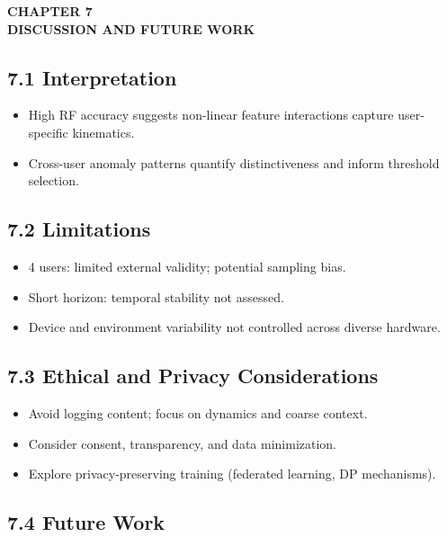 \documentclass[
  11pt,
  a4paper,
]{article}
\providecommand{\tightlist}{%
  \setlength{\itemsep}{0pt}\setlength{\parskip}{0pt}}
\begin{document}
\begin{center}
\vspace*{2cm}
\textbf{\Large CHAPTER 7}\\[0.5cm]
\textbf{\Large DISCUSSION AND FUTURE WORK}
\end{center}

\newpage

\subsection{7.1 Interpretation}\label{interpretation}

\begin{itemize}
\tightlist
\item
  High RF accuracy suggests non-linear feature interactions capture
  user-specific kinematics.
\item
  Cross-user anomaly patterns quantify distinctiveness and inform
  threshold selection.
\end{itemize}

\subsection{7.2 Limitations}\label{limitations}

\begin{itemize}
\tightlist
\item
  4 users: limited external validity; potential sampling bias.
\item
  Short horizon: temporal stability not assessed.
\item
  Device and environment variability not controlled across diverse
  hardware.
\end{itemize}

\subsection{7.3 Ethical and Privacy
Considerations}\label{ethical-and-privacy-considerations}

\begin{itemize}
\tightlist
\item
  Avoid logging content; focus on dynamics and coarse context.
\item
  Consider consent, transparency, and data minimization.
\item
  Explore privacy-preserving training (federated learning, DP
  mechanisms).
\end{itemize}

\subsection{7.4 Future Work}\label{future-work}
\end{document}
